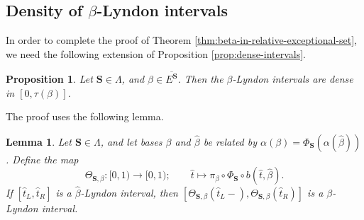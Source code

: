 \documentclass[11pt]{amsart}
\newtheorem{lemma}[theorem]{Lemma}
\newtheorem{proposition}[theorem]{Proposition}
\theoremstyle{definition}
\theoremstyle{remark}
\numberwithin{equation}{section}
\newcommand{\cs}{ {\mathbf{S}}}
\newcommand{\La}{\Lambda}
\begin{document}
\subsection{Density of $\beta$-Lyndon intervals}

In order to complete the proof of Theorem \ref{thm:beta-in-relative-exceptional-set}, we need the following extension of Proposition \ref{prop:dense-intervals}.

\begin{proposition} \label{prop:S-dense-intervals}
Let $\cs\in\La$, and $\beta\in \overline{E^\cs}$. Then the $\beta$-Lyndon intervals are dense in $[0,\tau(\beta)]$.
\end{proposition}

The proof uses the following lemma.

\begin{lemma} \label{lem:mapping-Lyndon-intervals}
Let $\cs\in\La$, and let bases $\beta$ and $\hat{\beta}$ be related by $\alpha(\beta)=\Phi_\cs(\alpha(\hat{\beta}))$. Define the map
\begin{equation} \label{eq:Theta_S}
\Theta_{\cs,\beta}: [0,1)\to [0,1); \qquad \hat{t}\mapsto \pi_\beta\circ\Phi_\cs\circ b(\hat{t},\hat{\beta}).
\end{equation}
If $[\hat{t}_L,\hat{t}_R]$ is a $\hat{\beta}$-Lyndon interval, then $[\Theta_{\cs,\beta}(\hat{t}_L-),\Theta_{\cs,\beta}(\hat{t}_R)]$ is a $\beta$-Lyndon interval. %
\end{lemma}
\end{document}
